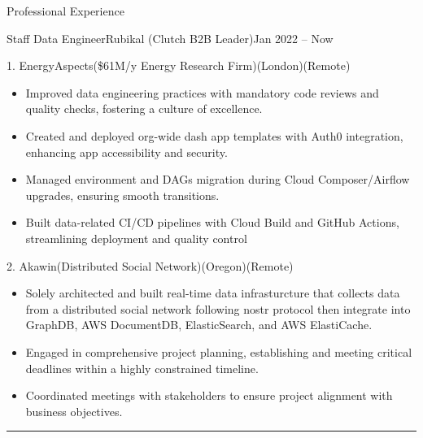 \documentclass[]{ahmedamrcv}
\begin{document}
\begin{cvsection}{Professional Experience}
\begin{cvsubsection}{Staff Data Engineer}{Rubikal (Clutch B2B Leader)}{Jan 2022 -- Now}
\begin{cvsubsection}{1. EnergyAspects}{(\$61M/y Energy Research Firm)}{(London)(Remote)}
\begin{itemize}
                        \item Improved data engineering practices with mandatory code reviews and quality checks, fostering a culture of excellence.

                        \item Created and deployed org-wide dash app templates with Auth0 integration, enhancing app accessibility and security.

                        \item Managed environment and DAGs migration during Cloud Composer/Airflow upgrades, ensuring smooth transitions.

                        \item Built data-related CI/CD pipelines with Cloud Build and GitHub Actions, streamlining deployment and quality control
    			\end{itemize}
    		\end{cvsubsection}
    
                \begin{cvsubsection}{2. Akawin}{(Distributed Social Network)}{(Oregon)(Remote)}
    			\begin{itemize}
    				\item Solely architected and built real-time data infrasturcture that collects data from a distributed social network following nostr protocol then integrate into GraphDB, AWS DocumentDB, ElasticSearch, and AWS ElastiCache.
                        \item Engaged in comprehensive project planning, establishing and meeting critical deadlines within a highly constrained timeline.
                        \item Coordinated meetings with stakeholders to ensure project alignment with business objectives.
    			\end{itemize}
    		\end{cvsubsection}
            \end{cvsubsection}

            \centering\rule{300pt}{0.4pt}
            

\end{cvsection}
\end{document}
